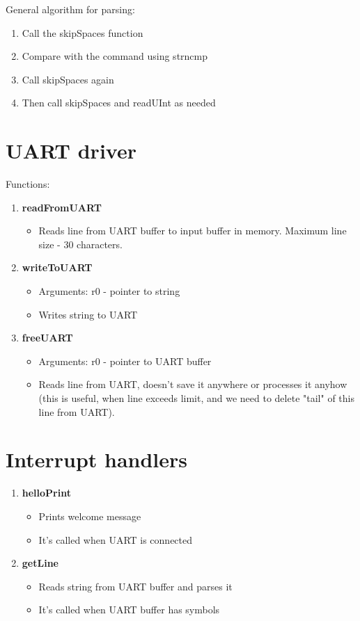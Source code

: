 General algorithm for parsing:

\begin{enumerate}
	\item Call the skipSpaces function
	\item Compare with the command using strncmp
	\item Call skipSpaces again
	\item Then call skipSpaces and readUInt as needed
\end{enumerate}

\section*{UART driver}

Functions:

\begin{enumerate}
	\item \textbf{readFromUART}
		\begin{itemize}
			\item Reads line from UART buffer to input buffer in memory. Maximum line size - 30 characters.
		\end{itemize}
	\item \textbf{writeToUART}
		\begin{itemize}
			\item Arguments: r0 - pointer to string
			\item Writes string to UART
		\end{itemize}
	\item \textbf{freeUART}
		\begin{itemize}
			\item Arguments: r0 - pointer to UART buffer
			\item Reads line from UART, doesn't save it anywhere or processes it anyhow (this is useful, when line exceeds limit, and we need to delete "tail" of this line from UART).
		\end{itemize}
\end{enumerate}

\section*{Interrupt handlers}

\begin{enumerate}
	\item \textbf{helloPrint}
		\begin{itemize}
			\item Prints welcome message
			\item It's called when UART is connected
		\end{itemize}
	\item \textbf{getLine}
		\begin{itemize}
			\item Reads string from UART buffer and parses it
			\item It's called when UART buffer has symbols
		\end{itemize}
\end{enumerate}

